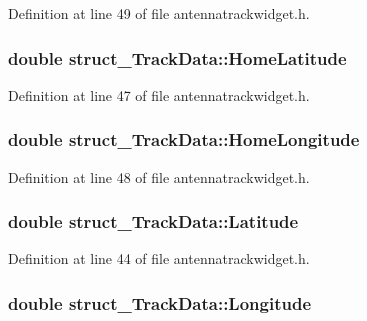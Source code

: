 \-Definition at line 49 of file antennatrackwidget.\-h.

\hypertarget{group___antenna_track_gadget_plugin_gad25500d6984ee3227abe9b2663c0a975}{
\subsubsection[{\-Home\-Latitude}]{\setlength{\rightskip}{0pt plus 5cm}double {\bf struct\-\_\-\-Track\-Data\-::\-Home\-Latitude}}}\label{group___antenna_track_gadget_plugin_gad25500d6984ee3227abe9b2663c0a975}


\-Definition at line 47 of file antennatrackwidget.\-h.

\hypertarget{group___antenna_track_gadget_plugin_ga297bb9a225f2fa6033327e0d99bc5eac}{
\subsubsection[{\-Home\-Longitude}]{\setlength{\rightskip}{0pt plus 5cm}double {\bf struct\-\_\-\-Track\-Data\-::\-Home\-Longitude}}}\label{group___antenna_track_gadget_plugin_ga297bb9a225f2fa6033327e0d99bc5eac}


\-Definition at line 48 of file antennatrackwidget.\-h.

\hypertarget{group___antenna_track_gadget_plugin_ga412a0215352cff81241572b0637ca6d5}{
\subsubsection[{\-Latitude}]{\setlength{\rightskip}{0pt plus 5cm}double {\bf struct\-\_\-\-Track\-Data\-::\-Latitude}}}\label{group___antenna_track_gadget_plugin_ga412a0215352cff81241572b0637ca6d5}


\-Definition at line 44 of file antennatrackwidget.\-h.

\hypertarget{group___antenna_track_gadget_plugin_gadd67067451f9adf6f25e45bcb7498a32}{
\subsubsection[{\-Longitude}]{\setlength{\rightskip}{0pt plus 5cm}double {\bf struct\-\_\-\-Track\-Data\-::\-Longitude}}}\label{group___antenna_track_gadget_plugin_gadd67067451f9adf6f25e45bcb7498a32}



